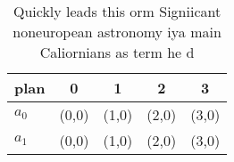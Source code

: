 \documentclass[a4paper]{article}
\begin{document}
\begin{table}
\begin{adjustbox}{width=0.5\columnwidth}
\begin{tabular}{|l|l|l|l|l|}
\hline
\textbf{plan} & \multicolumn{1}{c|}{\textbf{0}} & \multicolumn{1}{c|}{\textbf{1}} & \multicolumn{1}{c|}{\textbf{2}} & \multicolumn{1}{c|}{\textbf{3}} \\ \hline
\textbf{$a_0$}  & (0,0) & (1,0) & (2,0) & (3,0) \\ \hline
\textbf{$a_1$}  & (0,0) & (1,0) & (2,0) & (3,0) \\ \hline
\end{tabular}
\end{adjustbox}
\caption{Quickly leads this orm Signiicant noneuropean astronomy iya main Caliornians as term he d
}
\end{table}
\end{document}
